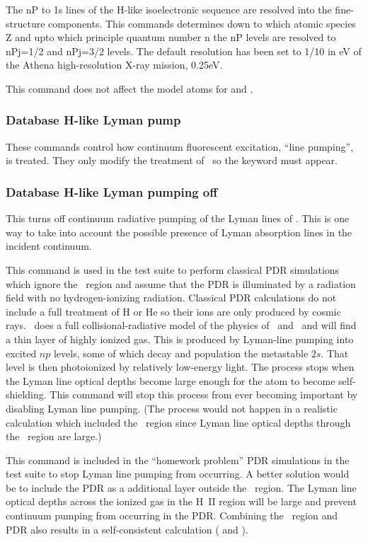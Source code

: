 The nP to 1s lines of the H-like isoelectronic sequence are resolved into the
fine-structure components. This commands determines down to which atomic species Z
and upto which principle quantum number n the nP levels are resolved to nPj=1/2 and
nPj=3/2 levels. The default resolution has been set to 1/10 in eV of the Athena
high-resolution X-ray mission, 0.25eV.

This command does not affect the model atoms for  and .

\subsubsection{Database H-like Lyman pump}  

These commands control how continuum fluorescent excitation, ``line pumping'', is treated.
They only modify the treatment of \hi\ so the  keyword must appear.

\subsubsection{Database H-like Lyman pumping off}  
This turns off continuum radiative pumping of the Lyman lines of \hi.
This is one way to take into account the possible
presence of Lyman absorption lines in the incident continuum.

This command is used in the test suite to perform classical PDR
simulations which ignore the \hplus\ region and assume that the PDR is
illuminated by a radiation field with no hydrogen-ionizing radiation.
Classical PDR calculations do not include a full treatment of H or He so
their ions are only produced by cosmic rays.
\Cloudy\ does a full collisional-radiative model
of the physics of \hO\ and \heO\
and will find a thin layer of highly ionized
gas.
This is produced by Lyman-line pumping into excited $np$ levels, some of which decay and
population the metastable $2s$.
That level is then photoionized by relatively low-energy light.
The process stops when the Lyman line optical depths become large enough
for the atom to become self-shielding.
This command will stop this
process from ever becoming important by disabling Lyman line pumping.
(The process would not happen in a realistic calculation
which included the \hplus\ region since Lyman line optical depths
through the \hplus\ region are large.)

This command is included in the ``homework problem'' PDR simulations
in the test suite to
stop Lyman line pumping from occurring.
A better solution would be to include
the PDR as a additional layer outside the \hplus\ region.
The Lyman line
optical depths across the ionized gas in the H~II region will be large and prevent continuum
pumping from occurring in the PDR.
Combining the \hii\ region and PDR also
results in a self-consistent calculation
(\citealp{Abel2005} and \citealp{Abel2008} ).

